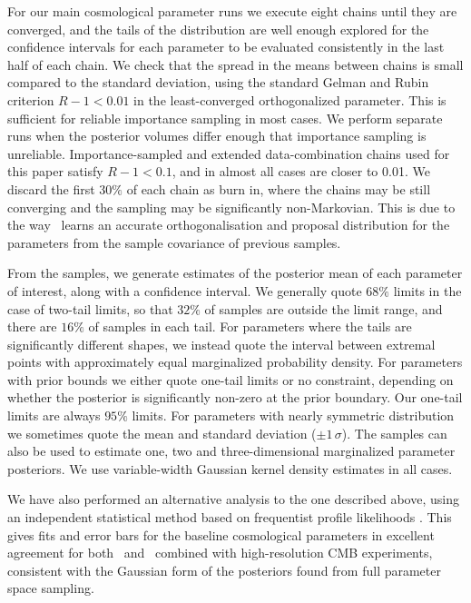 For our main cosmological parameter runs we execute eight chains until
they are converged, and the tails of the distribution are well enough
explored for the confidence intervals for each parameter to be evaluated
consistently in the last half of each chain.
We check that the spread in the means between chains is small
compared to the standard deviation, using the standard Gelman and Rubin
\citep{Gelman92} criterion $R-1 < 0.01$ in the least-converged
orthogonalized parameter. This is sufficient for reliable importance sampling
in most cases. We perform separate runs when the posterior volumes differ
enough that importance sampling is unreliable. Importance-sampled and extended
data-combination chains used for this paper satisfy $R-1 < 0.1$, and in almost
all cases are closer to 0.01.
We discard the first $30\%$ of each chain as burn in, where the
chains may be still converging and the sampling may be significantly
non-Markovian.  This is
due to the way \COSMOMC\ learns an accurate orthogonalisation
and proposal distribution for the parameters from the sample covariance
of previous samples.

From the samples, we generate estimates of the posterior mean of each
parameter of interest, along with a confidence interval.
We generally quote $68\%$ limits in the case of two-tail limits, so that
$32\%$ of samples are outside the limit range, and
there are $16\%$ of samples in each tail. For parameters where
the tails are significantly different shapes, we instead quote the interval
between extremal points with approximately equal marginalized probability density.
For parameters with prior bounds we either quote one-tail limits or
no constraint, depending on whether the posterior is significantly non-zero at the prior boundary. Our one-tail limits are always $95\%$ limits.
For parameters with nearly symmetric distribution we sometimes quote the mean and standard deviation ($\pm 1\,\sigma$).
The samples can also be used to estimate one,
two and three-dimensional marginalized parameter posteriors.
We use variable-width Gaussian kernel density estimates in all cases.

We have also performed an alternative analysis to the one described above, using an independent statistical method based on frequentist
profile likelihoods \citep{ProfileLik}.
This gives fits and error bars for the baseline cosmological parameters in excellent
agreement for both \Planck\ and \Planck\ combined with high-resolution CMB experiments,
consistent with the Gaussian form of the posteriors found from full parameter space sampling.



